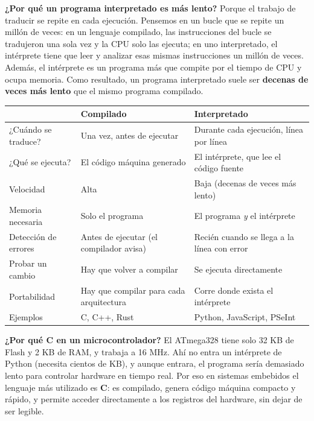 \textbf{¿Por qué un programa interpretado es más lento?} Porque el trabajo de traducir se repite en cada ejecución. Pensemos en un bucle que se repite un millón de veces: en un lenguaje compilado, las instrucciones del bucle se tradujeron una sola vez y la CPU solo las ejecuta; en uno interpretado, el intérprete tiene que leer y analizar esas mismas instrucciones un millón de veces. Además, el intérprete es un programa más que compite por el tiempo de CPU y ocupa memoria. Como resultado, un programa interpretado suele ser \textbf{decenas de veces más lento} que el mismo programa compilado.

\begin{table}[H]
\centering
\renewcommand{\arraystretch}{1.3}
\begin{tabularx}{\textwidth}{>{\raggedright\arraybackslash}p{3.4cm}
    >{\raggedright\arraybackslash}X >{\raggedright\arraybackslash}X}
\toprule
 & \textbf{Compilado} & \textbf{Interpretado} \\
\midrule
¿Cuándo se traduce? & Una vez, antes de ejecutar & Durante cada ejecución, línea por línea \\
¿Qué se ejecuta? & El código máquina generado & El intérprete, que lee el código fuente \\
Velocidad & Alta & Baja (decenas de veces más lento) \\
Memoria necesaria & Solo el programa & El programa \emph{y} el intérprete \\
Detección de errores & Antes de ejecutar (el compilador avisa) & Recién cuando se llega a la línea con error \\
Probar un cambio & Hay que volver a compilar & Se ejecuta directamente \\
Portabilidad & Hay que compilar para cada arquitectura & Corre donde exista el intérprete \\
Ejemplos & C, C++, Rust & Python, JavaScript, PSeInt \\
\bottomrule
\end{tabularx}
\end{table}

\begin{importantebox}
\textbf{¿Por qué C en un microcontrolador?} El ATmega328 tiene solo 32 KB de Flash y 2 KB de RAM, y trabaja a 16 MHz. Ahí no entra un intérprete de Python (necesita cientos de KB), y aunque entrara, el programa sería demasiado lento para controlar hardware en tiempo real. Por eso en sistemas embebidos el lenguaje más utilizado es \textbf{C}: es compilado, genera código máquina compacto y rápido, y permite acceder directamente a los registros del hardware, sin dejar de ser legible.
\end{importantebox}

